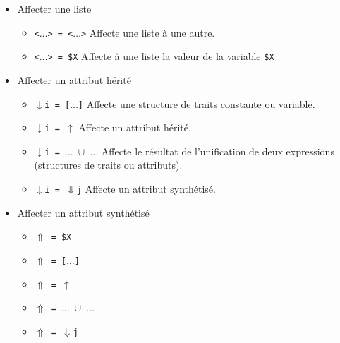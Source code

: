 \documentclass[11pt]{article}
\begin{document}
\begin{itemize}
\begin{itemize}
  \item  Affecter une liste
    \begin{itemize}
    \item  \verb#<#$\dots$\verb#> = <#$\dots$\verb#># Affecte une liste à
      une autre.
    \item \verb#<#$\dots$\verb#> = $X# Affecte à une liste la valeur de la
      variable \verb#$X#
    \end{itemize}
    
  \item  Affecter un attribut hérité
    \begin{itemize}
    \item $\downarrow$\verb#i = [#$\dots$\verb#]# Affecte une
      structure de traits constante ou variable.
    \item $\downarrow$\verb#i = #$\uparrow$ Affecte un attribut hérité.
    \item $\downarrow$\verb#i = #$\dots$\verb# #$\cup$\verb# #$\dots$
      Affecte le résultat de l'unification de deux expressions
      (structures de traits ou attributs).
    \item $\downarrow$\verb#i = #$\Downarrow$\verb#j# Affecte un
      attribut synthétisé.
    \end{itemize}
    
  \item  Affecter un attribut synthétisé
    \begin{itemize}
    \item $\Uparrow$\verb# = $X#
    \item $\Uparrow$\verb# = [#$\dots$\verb#]#
    \item $\Uparrow$\verb# = #$\uparrow$
    \item $\Uparrow$\verb# = #$\dots$\verb# #$\cup$\verb# #$\dots$
    \item $\Uparrow$\verb# = #$\Downarrow$\verb#j#
    \end{itemize}
    

\end{itemize}
\end{itemize}
\end{document}
